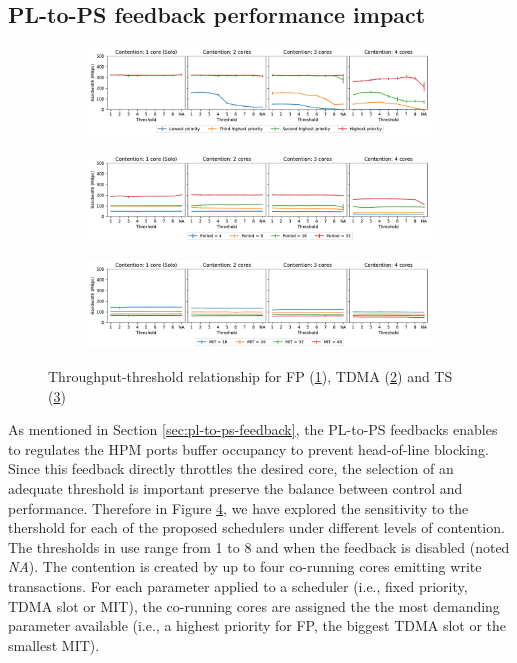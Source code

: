 \subsection{PL-to-PS feedback performance impact}
\label{sec:feedback-pressure}
\begin{figure}[]
  \centering
  \begin{subfigure}{0.9\textwidth}
    \centering
    \includegraphics[scale=0.4]{images/fp.pdf}
    \caption{}
    \label{fig:threshold_fp}
  \end{subfigure}
  \hfill
  \begin{subfigure}{0.9\textwidth}
    \centering
    \includegraphics[scale=0.4]{images/tdma.pdf}
    \caption{}
    \label{fig:threshold_tdma}
  \end{subfigure}
  \hfill
  \begin{subfigure}{0.9\textwidth}
    \centering
    \includegraphics[scale=0.4]{images/ts.pdf}
    \caption{}
    \label{fig:threshold_ts}
  \end{subfigure}
  \caption{Throughput-threshold relationship for FP (\ref{fig:threshold_fp}), TDMA (\ref{fig:threshold_tdma}) and TS (\ref{fig:threshold_ts})}
  \label{fig:schim_threshold}
\end{figure}
As mentioned in Section \ref{sec:pl-to-ps-feedback}, the PL-to-PS feedbacks enables
\schim to regulates the HPM ports buffer occupancy to prevent head-of-line blocking.
Since this feedback directly throttles the desired core, the selection of an adequate
threshold is important preserve the balance between control and performance.
Therefore in Figure \ref{fig:schim_threshold}, we have explored the sensitivity
to the thershold for each of the proposed schedulers under different levels of contention.
The thresholds in use range from 1 to 8 and when the feedback is disabled
(noted \emph{NA}). The contention is created by up to four co-running cores emitting
write transactions. For each parameter applied to a scheduler (i.e., fixed
priority, TDMA slot or MIT), the co-running cores are assigned the the most
demanding parameter available (i.e., a highest priority for FP, the biggest TDMA
slot or the smallest MIT).

